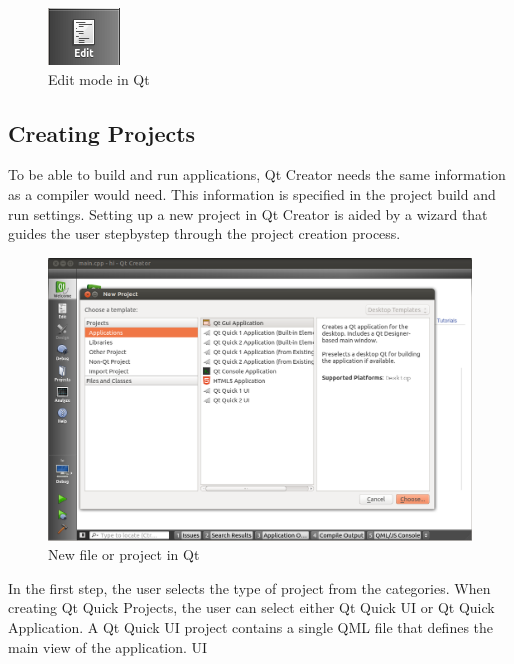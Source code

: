 \begin{figure}[h]
\begin{center}
\includegraphics[scale=0.8]{images/edit.png}
\caption{Edit mode in Qt}
\end{center}
\end{figure}

\newpage



\subsection{Creating Projects}

To  be  able  to  build  and  run  applications,  Qt  Creator  needs  the  same  information  as  a  compiler  would
need.  This  information  is  specified  in  the  project  build  and  run  settings.  Setting  up  a  new  project  in  Qt
Creator  is  aided  by  a  wizard  that  guides  the  user  step­by­step  through  the  project  creation  process. 
\begin{figure}[htb]
\begin{center}
\includegraphics[scale=0.4]{images/new.png}
\caption{New file or project in Qt}
\end{center}
\end{figure}
In the  first  step,  the  user  selects  the  type of project from the categories. When  creating Qt Quick Projects,
the user can select either Qt Quick UI or Qt Quick Application.
A  Qt  Quick  UI  project  contains  a  single  QML  file  that  defines  the  main  view  of  the  application.  UI
